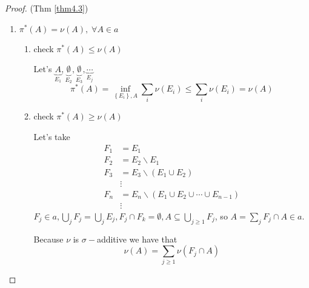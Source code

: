 \begin{proof}(Thm \ref{thm4.3})
	\begin{enumerate}
		\item ${\pi ^*}\left( A \right) = \nu \left( A \right),\;\forall A \in a$
		\begin{enumerate}
			\item check ${\pi ^*}\left( A \right) \leqslant \nu \left( A \right)$
			
			Let's $\underbrace A_{{E_1}},\underbrace \emptyset _{{E_2}},\underbrace \emptyset _{{E_3}},\underbrace  \cdots _{{E_j}}$
			\begin{equation}
			{\pi ^*}\left( A \right) = \mathop {\inf }\limits_{\left\{ {{E_i}} \right\},A} \sum\limits_i {\nu \left( {{E_i}} \right)}  \leqslant \sum\limits_i {\nu \left( {{E_i}} \right)}  = \nu \left( A \right)
			\label{eq4.43}
			\end{equation}
			\item check ${\pi ^*}\left( A \right) \geqslant \nu \left( A \right)$
			
			Let's take
			\begin{equation}
			\begin{split}
			{F_1} & = {E_1}\\
			{F_2} & = {E_2}\backslash {E_1}\\
			{F_3} & = {E_3}\backslash \left( {{E_1} \cup {E_2}} \right)\\
			      & \vdots \\
			{F_n} & = {E_n}\backslash \left( {{E_1} \cup {E_2} \cup  \cdots  \cup {E_{n - 1}}} \right)\\
			      & \vdots
			\end{split}
			\label{eq4.44}
			\end{equation}
			${F_j} \in a,\bigcup\limits_j {{F_j}}  = \bigcup\limits_j {{E_j}} ,{F_j} \cap {F_k} = \emptyset ,A \subseteq \bigcup\limits_{j \geqslant 1} {{F_j}} $, so $A = \sum\limits_j {{F_j} \cap A \in a} $. 
			
			Because $ \nu $  is $ \sigma- $additive we have that
			\begin{equation}
			\nu \left( A \right) = \sum\limits_{j \geqslant 1} {\nu \left( {{F_j} \cap A} \right)} 
			\label{eq4.45}
			\end{equation}
			

\end{enumerate}
\end{enumerate}
\end{proof}
